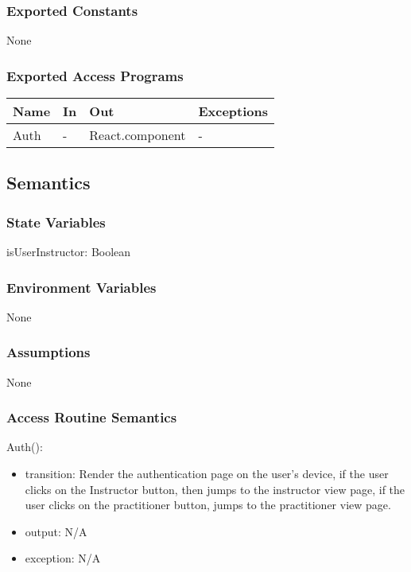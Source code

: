 \documentclass[12pt, titlepage]{article}
\begin{document}
\subsubsection{Exported Constants}
None

\subsubsection{Exported Access Programs}
\begin{table}[h!]
  \centering
  \begin{tabular}{llll}
    \toprule
    \textbf{Name} & \textbf{In} & \textbf{Out}             & \textbf{Exceptions} \\
    \midrule
    Auth          & -           & React.component          & -                   \\
    \bottomrule
  \end{tabular}
\end{table}

\subsection{Semantics}

\subsubsection{State Variables}
isUserInstructor: Boolean

\subsubsection{Environment Variables}
None

\subsubsection{Assumptions}
None

\subsubsection{Access Routine Semantics}

\noindent Auth():
\begin{itemize}
  \item transition: Render the authentication page on the user's device, if the user clicks on the Instructor button, then jumps to the instructor view page, if the user clicks on the practitioner button, jumps to the practitioner view page.
  \item output: N/A
  \item exception: N/A
\end{itemize}
\end{document}
